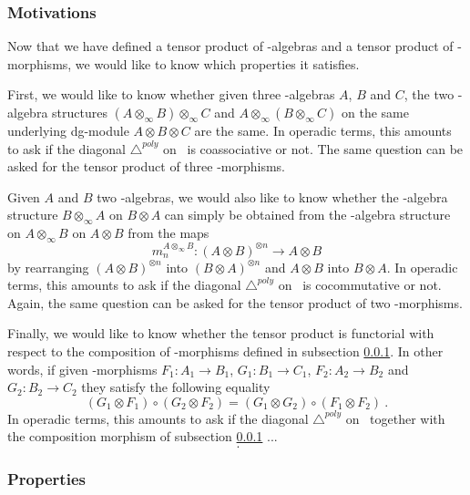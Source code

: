 \documentclass[twoside, 12pt]{amsart}
\theoremstyle{remark}
\begin{document}
\subsubsection{Motivations}

Now that we have defined a tensor product of \Ainf -algebras and a tensor product of \Ainf -morphisms, we would like to know which properties it satisfies.

First, we would like to know whether given three \Ainf -algebras $A$, $B$ and $C$, the two \Ainf -algebra structures $( A \otimes_\infty B) \otimes_\infty C$ and $A \otimes_\infty ( B \otimes_\infty C)$ on the same underlying dg-module $A \otimes B \otimes C$ are the same. In operadic terms, this amounts to ask if the diagonal $\triangle^{poly}$ on \Ainf\ is coassociative or not. The same question can be asked for the tensor product of three \Ainf -morphisms.

Given $A$ and $B$ two \Ainf -algebras, we would also like to know whether the \Ainf -algebra structure $B \otimes_\infty A$ on $B \otimes A$ can simply be obtained from the \Ainf -algebra structure on $A \otimes_\infty B$ on $A \otimes B$ from the maps \[ m_n^{A \otimes_\infty B} : ( A \otimes B)^{\otimes n} \rightarrow A \otimes B \] by rearranging $(A \otimes B)^{\otimes n}$ into $(B \otimes A)^{\otimes n}$ and $A \otimes B$ into $B \otimes A$. In operadic terms, this amounts to ask if the diagonal $\triangle^{poly}$ on \Ainf\ is cocommutative or not. Again, the same question can be asked for the tensor product of two \Ainf -morphisms. 


Finally, we would like to know whether the tensor product is functorial with respect to the composition of \Ainf -morphisms defined in subsection \ref{}. In other words, if given \Ainf -morphisms $F_1 : A_1 \rightarrow B_1$, 
$G_1 : B_1 \rightarrow C_1$, $F_2 : A_2 \rightarrow B_2$ and
$G_2 : B_2 \rightarrow C_2$ they satisfy the following equality
\[ ( G_1 \otimes F_1) \circ (G_2 \otimes F_2) = (G_1 \otimes G_2) \circ (F_1 \otimes F_2) \ . \]
In operadic terms, this amounts to ask if the diagonal $\triangle^{poly}$ on \Minf\ together with the composition morphism  of subsection \ref{} ... 
\[ \ . \]

\subsubsection{Properties} \label{sss:properties-polytopal}
\end{document}
